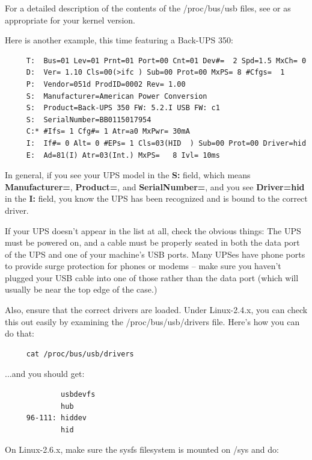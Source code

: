 For a detailed description of the contents of the /proc/bus/usb files, see
 or 
 as
appropriate for your kernel version.

Here is another example, this time featuring a Back-UPS 350:

\begin{verbatim}
     T:  Bus=01 Lev=01 Prnt=01 Port=00 Cnt=01 Dev#=  2 Spd=1.5 MxCh= 0
     D:  Ver= 1.10 Cls=00(>ifc ) Sub=00 Prot=00 MxPS= 8 #Cfgs=  1
     P:  Vendor=051d ProdID=0002 Rev= 1.00
     S:  Manufacturer=American Power Conversion
     S:  Product=Back-UPS 350 FW: 5.2.I USB FW: c1
     S:  SerialNumber=BB0115017954
     C:* #Ifs= 1 Cfg#= 1 Atr=a0 MxPwr= 30mA
     I:  If#= 0 Alt= 0 #EPs= 1 Cls=03(HID  ) Sub=00 Prot=00 Driver=hid
     E:  Ad=81(I) Atr=03(Int.) MxPS=   8 Ivl= 10ms
\end{verbatim}

In general, if you see your UPS model in the {\bf S:} field, which means
{\bf Manufacturer=}, {\bf Product=}, and {\bf SerialNumber=}, and you see
{\bf Driver=hid} in the {\bf I:} field, you know the UPS has been recognized
and is bound to the correct driver.

If your UPS doesn't appear in the list at all, check the obvious things:
The UPS must be powered on, and a cable must be properly seated in both the
data port of the UPS and one of your machine's USB ports. Many UPSes have 
phone ports to provide surge protection for phones or modems {--} make
sure you haven't plugged your USB cable into one of those rather than the
data port (which will usually be near the top edge of the case.)  

Also, ensure that the correct drivers are loaded. Under Linux-2.4.x, you can
check this out easily by examining the /proc/bus/usb/drivers file.  Here's
how you can do that: 

\begin{verbatim}
     cat /proc/bus/usb/drivers
\end{verbatim}

...and you should get:

\begin{verbatim}
             usbdevfs
             hub
     96-111: hiddev
             hid
\end{verbatim}

On Linux-2.6.x, make sure the sysfs filesystem is mounted on /sys and do: 


